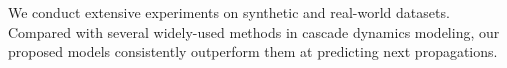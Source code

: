 % 
% 
We conduct extensive experiments on synthetic
and real-world datasets. Compared with several widely-used methods in cascade
dynamics modeling, our proposed models consistently outperform them at
predicting next propagations. 


% 

% 
% 

% 
